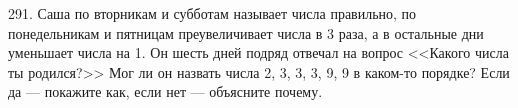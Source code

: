 291. Саша по вторникам и субботам называет числа правильно, по понедельникам и пятницам преувеличивает числа в 3 раза, а в остальные дни уменьшает числа на 1. Он шесть дней подряд отвечал на вопрос <<Какого числа ты родился?>> Мог ли он назвать числа 2, 3, 3, 3, 9, 9 в каком-то порядке? Если да --- покажите как, если нет --- объясните почему.\\

